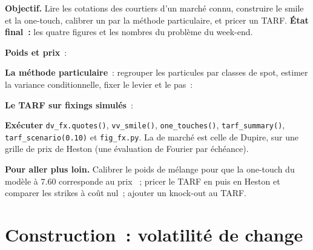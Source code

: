 \begin{tutorial}
\textbf{Objectif.} Lire les cotations des courtiers d'un marché connu, construire le smile  et la one-touch, calibrer un 
par la méthode particulaire, et pricer un TARF. \textbf{État final~:} les quatre figures et les nombres du problème du week-end.
\begin{tutsteps}
\item \textbf{Poids  et prix}~:
\label{lst:dv:fx-derivatives:vv}
\item \textbf{La méthode particulaire}~: regrouper les particules par classes de spot, estimer la variance conditionnelle, fixer le levier et le pas~:
\label{lst:dv:fx-derivatives:particle}
\item \textbf{Le TARF sur fixings simulés}~:
\label{lst:dv:fx-derivatives:tarf}
\item \textbf{Exécuter} \texttt{dv\_fx.quotes()}, \texttt{vv\_smile()}, \texttt{one\_touches()}, \texttt{tarf\_summary()}, \texttt{tarf\_scenario(0.10)} et
\texttt{fig\_fx.py}. La  de marché est celle de Dupire, sur une grille de prix de Heston (une évaluation de Fourier par échéance).
\end{tutsteps}
\textbf{Pour aller plus loin.} Calibrer le poids de mélange pour que la one-touch du modèle à 7.60 corresponde au prix ~; pricer le TARF en 
puis en Heston et comparer les strikes à coût nul~; ajouter un knock-out au TARF.
\end{tutorial}

\section{Construction~: volatilité de change}\label{bld:dv:fx-derivatives:fxvol}

